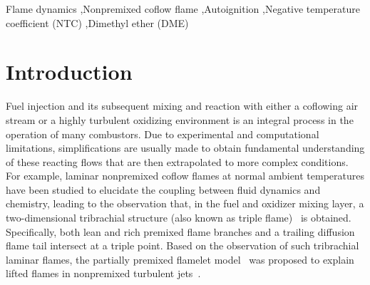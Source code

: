 \documentclass[review,3p,times]{elsarticle}
\begin{document}
\begin{frontmatter}
\begin{abstract}
\end{abstract}

\begin{keyword} 
Flame dynamics \sep Nonpremixed coflow flame \sep Autoignition \sep Negative temperature coefficient (NTC) \sep Dimethyl ether (DME) 
\end{keyword}

\end{frontmatter}



\section{Introduction}

Fuel injection and its subsequent mixing and reaction with either a coflowing air stream or a highly turbulent oxidizing environment is an integral process in the operation of many combustors.  Due to experimental and computational limitations, simplifications are usually made to obtain fundamental understanding of these reacting flows that are then extrapolated to more complex conditions.  For example, laminar nonpremixed coflow flames at normal ambient temperatures have been studied to elucidate the coupling between fluid dynamics and chemistry, leading to the observation that, in the fuel and oxidizer mixing layer, a two-dimensional tribrachial structure (also known as triple flame)~\cite{buckmaster02} is obtained.  Specifically, both lean and rich premixed flame branches and a trailing diffusion flame tail intersect at a triple point.  Based on the observation of such tribrachial laminar flames, the partially premixed flamelet model~\cite{muller94} was proposed to explain lifted flames in nonpremixed turbulent jets~\cite{chung07}.
\end{document}
